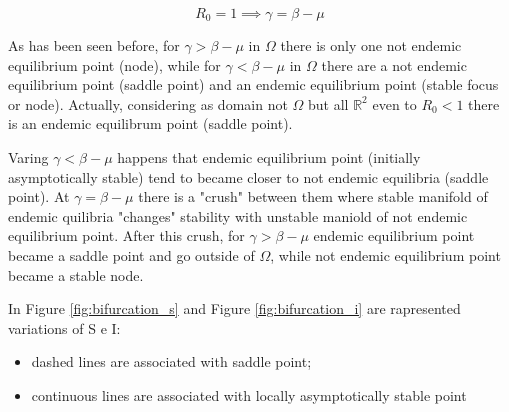 \begin{equation}
    R_0 = 1 \implies \gamma =  \beta - \mu
\end{equation}

As has been seen before, for $\gamma > \beta-\mu$ in $\Omega$ there is only one not endemic equilibrium point (node), while for $\gamma < \beta-\mu$ in $\Omega$ there are a not endemic equilibrium point (saddle point) and an endemic equilibrium point (stable focus or node). Actually, considering as domain not $\Omega$ but all $\mathbb{R}^2$ even to $R_0 < 1$ there is an endemic equilibrum point (saddle point).

Varing $\gamma < \beta-\mu$ happens that endemic equilibrium point (initially asymptotically stable) tend to became closer to not endemic equilibria (saddle point). At $\gamma = \beta-\mu$ there is a "crush" between them where stable manifold of endemic quilibria "changes" stability with unstable maniold of not endemic equilibrium point.
After this crush, for $\gamma > \beta-\mu$ endemic equilibrium point became a saddle point and go outside of $\Omega$, while not endemic equilibrium point became a stable node.

In Figure \ref{fig:bifurcation_s} and Figure \ref{fig:bifurcation_i} are rapresented variations of S e I:
\begin{itemize}
    \item dashed lines are associated with saddle point;
    \item continuous lines are associated with locally asymptotically stable point
\end{itemize}

